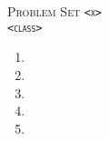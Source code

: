 





\begin{center}
    \textsc{\huge Problem Set \texttt{<x>}}\\
    \textsc{\texttt{<class>}}\\
\end{center}

\begin{enumerate}
    \item
    \item
    \item
    \item
    \item
\end{enumerate}

